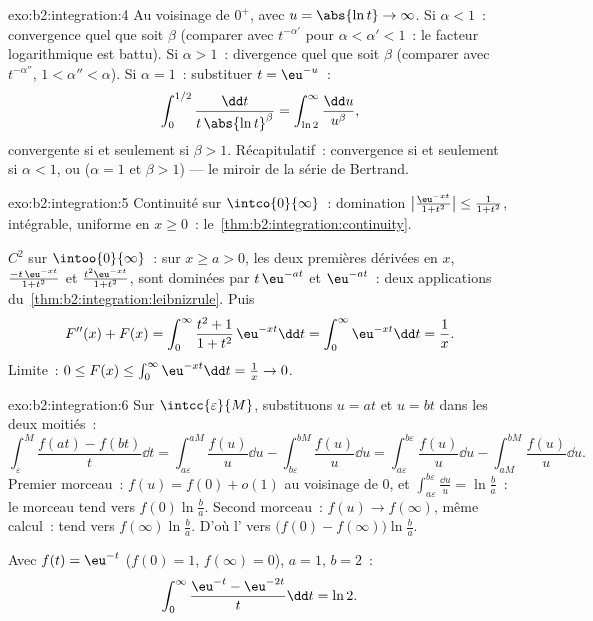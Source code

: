 \begin{solution}{exo:b2:integration:4}
Au voisinage de $0^+$, avec $u = \abs{\ln t} \to \infty$. Si $\alpha < 1$~:
convergence quel que soit $\beta$ (comparer avec $t^{-\alpha'}$ pour
$\alpha < \alpha' < 1$~: le facteur logarithmique est battu). Si $\alpha > 1$~:
divergence quel que soit $\beta$ (comparer avec $t^{-\alpha''}$,
$1 < \alpha'' < \alpha$). Si $\alpha = 1$~: substituer $t =
\eu^{-u}$~:
\[
\int_0^{1/2} \frac{\dd t}{t\,\abs{\ln t}^\beta}
= \int_{\ln 2}^{\infty} \frac{\dd u}{u^\beta},
\]
convergente si et seulement si $\beta > 1$. Récapitulatif~: convergence si et seulement si $\alpha < 1$,
ou ($\alpha = 1$ et $\beta > 1$) --- le miroir de la série de Bertrand.
\end{solution}

\begin{solution}{exo:b2:integration:5}
Continuité sur $\intco{0}{\infty}$~: domination
$\bigl|\frac{\eu^{-xt}}{1+t^2}\bigr| \leq \frac{1}{1+t^2}$,
intégrable, uniforme en $x \geq 0$~:
le~\cref{thm:b2:integration:continuity}.

$C^2$ sur $\intoo{0}{\infty}$~: sur $x \geq a > 0$, les deux premières
dérivées en $x$, $\frac{-t\,\eu^{-xt}}{1+t^2}$ et
$\frac{t^2\eu^{-xt}}{1+t^2}$, sont dominées par $t\,\eu^{-at}$ et
$\eu^{-at}$~: deux applications du~\cref{thm:b2:integration:leibnizrule}.
Puis
\[
F''(x) + F(x) = \int_0^\infty \frac{t^2 + 1}{1 + t^2}\,\eu^{-xt}\dd
t = \int_0^\infty \eu^{-xt}\dd t = \frac1x .
\]
Limite~: $0 \leq F(x) \leq \int_0^\infty \eu^{-xt}\dd t = \frac1x \to
0$.
\end{solution}

\begin{solution}{exo:b2:integration:6}
Sur $\intcc{\varepsilon}{M}$, substituons $u = at$ et $u = bt$ dans
les deux moitiés~:
\[
\int_\varepsilon^M \frac{f(at) - f(bt)}{t}\dd t
= \int_{a\varepsilon}^{aM}\frac{f(u)}{u}\dd u
- \int_{b\varepsilon}^{bM}\frac{f(u)}{u}\dd u
= \int_{a\varepsilon}^{b\varepsilon} \frac{f(u)}{u}\dd u
- \int_{aM}^{bM} \frac{f(u)}{u}\dd u .
\]
Premier morceau~: $f(u) = f(0) + o(1)$ au voisinage de $0$, et $\int_{a\varepsilon}
^{b\varepsilon} \frac{\dd u}{u} = \ln\frac ba$~: le morceau tend vers
$f(0)\ln\frac ba$. Second morceau~: $f(u) \to f(\infty)$, même
calcul~: tend vers $f(\infty)\ln\frac ba$. D'où l'
 vers $\bigl(f(0) - f(\infty)\bigr)\ln\frac ba$.

Avec $f(t) = \eu^{-t}$ ($f(0) = 1$, $f(\infty) = 0$), $a = 1$, $b
= 2$~:
\[
\int_0^\infty \frac{\eu^{-t} - \eu^{-2t}}{t}\dd t = \ln 2 .
\]
\end{solution}

